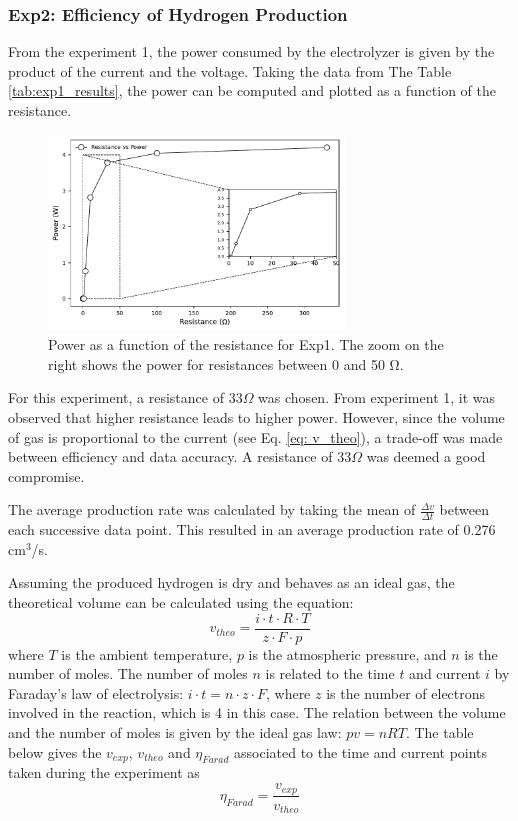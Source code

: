 \subsubsection{Exp2: Efficiency of Hydrogen Production}
From the experiment 1, the power consumed by the electrolyzer is given by the product of the current and the voltage. Taking the data from The Table \ref{tab:exp1_results}, the power can be computed and plotted as a function of the resistance. 
\begin{figure}[H]
    \centering
    \includegraphics[width=0.7\textwidth]{Output/Exp1_R_vs_power_with_zoom.pdf}
    \caption{Power as a function of the resistance for Exp1. The zoom on the right shows the power for resistances between 0 and 50 $\si{\ohm}$.}
    \label{fig:summary_results:exp1}
\end{figure}
For this experiment, a resistance of 33$\Omega$ was chosen. From experiment 1, it was observed that higher resistance leads to higher power. However, since the volume of gas is proportional to the current (see Eq. \ref{eq: v_theo}), a trade-off was made between efficiency and data accuracy. A resistance of 33$\Omega$ was deemed a good compromise.

The average production rate was calculated by taking the mean of $\frac{\Delta v}{\Delta t}$ between each successive data point. This resulted in an average production rate of 0.276 cm$^3$/s.

Assuming the produced hydrogen is dry and behaves as an ideal gas, the theoretical volume can be calculated using the equation:
\begin{equation}
    v_{theo} = \frac{i \cdot t \cdot R \cdot T}{z \cdot F \cdot p} \label{eq: v_theo}
\end{equation}
where $T$ is the ambient temperature, $p$ is the atmospheric pressure, and $n$ is the number of moles. The number of moles $n$ is related to the time $t$ and current $i$ by Faraday’s law of electrolysis: $i \cdot t = n \cdot z \cdot F$, where $z$ is the number of electrons involved in the reaction, which is 4 in this case. The relation between the volume and the number of moles is given by the ideal gas law: $pv = nRT$.
The table below gives the $v_{exp}$, $v_{theo}$ and $\eta_{Farad}$ associated to the time and current points taken during the experiment as 
\begin{equation}
    \eta_{Farad} = \frac{v_{exp}}{v_{theo}}
\end{equation}

